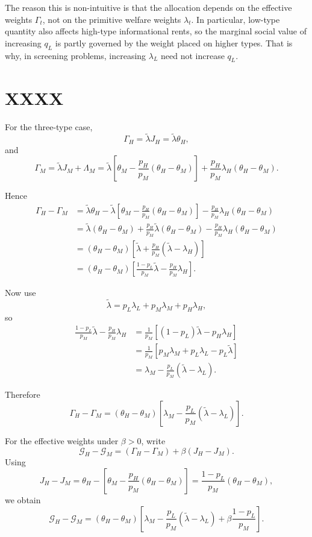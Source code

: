 \documentclass[11pt]{article}
\begin{document}
The reason this is non-intuitive is that the allocation depends on the effective weights \(\Gamma_t\), not on the primitive welfare weights \(\lambda_t\). In particular, low-type quantity also affects high-type informational rents, so the marginal social value of increasing \(q_L\) is partly governed by the weight placed on higher types. That is why, in screening problems, increasing \(\lambda_L\) need not increase \(q_L\).
\section{XXXX}

For the three-type case,
\[
\Gamma_H=\tilde\lambda J_H=\tilde\lambda \theta_H,
\]
and
\[
\Gamma_M=\tilde\lambda J_M+\Lambda_M
=
\tilde\lambda\left[\theta_M-\frac{p_H}{p_M}\left(\theta_H-\theta_M\right)\right]
+
\frac{p_H}{p_M}\lambda_H\left(\theta_H-\theta_M\right).
\]

Hence
\begin{align*}
\Gamma_H-\Gamma_M
&=
\tilde\lambda\theta_H
-
\tilde\lambda\left[\theta_M-\frac{p_H}{p_M}\left(\theta_H-\theta_M\right)\right]
-
\frac{p_H}{p_M}\lambda_H\left(\theta_H-\theta_M\right) \\
&=
\tilde\lambda\left(\theta_H-\theta_M\right)
+
\frac{p_H}{p_M}\tilde\lambda\left(\theta_H-\theta_M\right)
-
\frac{p_H}{p_M}\lambda_H\left(\theta_H-\theta_M\right) \\
&=
\left(\theta_H-\theta_M\right)
\left[
\tilde\lambda+\frac{p_H}{p_M}\left(\tilde\lambda-\lambda_H\right)
\right] \\
&=
\left(\theta_H-\theta_M\right)
\left[
\frac{1-p_L}{p_M}\tilde\lambda-\frac{p_H}{p_M}\lambda_H
\right].
\end{align*}

Now use
\[
\tilde\lambda=p_L\lambda_L+p_M\lambda_M+p_H\lambda_H,
\]
so
\begin{align*}
\frac{1-p_L}{p_M}\tilde\lambda-\frac{p_H}{p_M}\lambda_H
&=
\frac{1}{p_M}\left[(1-p_L)\tilde\lambda-p_H\lambda_H\right] \\
&=
\frac{1}{p_M}\left[p_M\lambda_M+p_L\lambda_L-p_L\tilde\lambda\right] \\
&=
\lambda_M-\frac{p_L}{p_M}\left(\tilde\lambda-\lambda_L\right).
\end{align*}

Therefore
\[
\Gamma_H-\Gamma_M
=
\left(\theta_H-\theta_M\right)
\left[
\lambda_M-\frac{p_L}{p_M}\left(\tilde\lambda-\lambda_L\right)
\right].
\]

For the effective weights under \(\beta>0\), write
\[
\mathcal G_H-\mathcal G_M
=
\left(\Gamma_H-\Gamma_M\right)+\beta\left(J_H-J_M\right).
\]
Using
\[
J_H-J_M
=
\theta_H-\left[\theta_M-\frac{p_H}{p_M}\left(\theta_H-\theta_M\right)\right]
=
\frac{1-p_L}{p_M}\left(\theta_H-\theta_M\right),
\]
we obtain
\[
\mathcal G_H-\mathcal G_M
=
\left(\theta_H-\theta_M\right)
\left[
\lambda_M-\frac{p_L}{p_M}\left(\tilde\lambda-\lambda_L\right)
+
\beta\frac{1-p_L}{p_M}
\right].
\]
\end{document}
